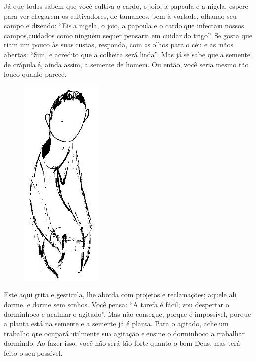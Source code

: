 \bigskip
\bigskip

Já que todos sabem que você cultiva o cardo, o joio, a papoula e a
nigela, espere para ver chegarem os cultivadores, de tamancos, bem à
vontade, olhando seu campo e dizendo: ``Eis a nigela, o joio, a papoula
e o cardo que infectam nossos campos,cuidados como ninguém sequer
pensaria em cuidar do trigo''. Se gosta que riam um pouco às suas
custas, responda, com os olhos para o céu e as mãos abertas: ``Sim, e
acredito que a colheita será linda''. Mas já se sabe que a semente de
crápula é, ainda assim, a semente de homem. Ou então, você seria mesmo
tão louco quanto parece.

\bigskip
\bigskip

\begin{figure}
  \includegraphics[width=40mm]{./imgs/Image_2.jpg}
 \end{figure}

Este aqui grita e gesticula, lhe aborda com projetos e reclamações;
aquele ali dorme, e dorme sem sonhos. Você pensa: ``A tarefa é fácil;
vou despertar o dorminhoco e acalmar o agitado''. Mas não consegue,
porque é impossível, porque a planta está na semente e a semente já é
planta. Para o agitado, ache um trabalho que ocupará utilmente sua
agitação e ensine o dorminhoco a trabalhar dormindo. Ao fazer isso, você
não será tão forte quanto o bom Deus, mas terá feito o seu possível.

